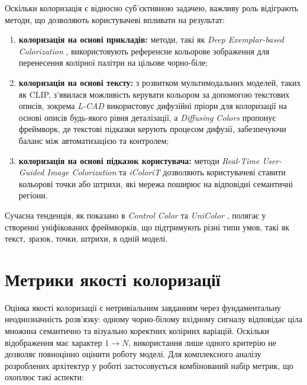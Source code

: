         Оскільки колоризація є відносно суб'єктивною задачею, важливу роль відіграють методи, що дозволяють користувачеві впливати на результат:
        \begin{enumerate}
            \item \textbf{колоризація на основі прикладів:}
                методи, такі як \textit{Deep Exemplar-based Colorization} \cite{2018-deep-exemplar-based-colorization}, використовують референсне кольорове зображення для перенесення колірної палітри на цільове чорно-біле;

            \item \textbf{колоризація на основі тексту:}
                з розвитком мультимодальних моделей, таких як CLIP, з'явилася можливість керувати кольором за допомогою текстових описів,
                зокрема \textit{L-CAD} \cite{2023-l-cad} використовує дифузійні пріори для колоризації на основі описів будь-якого рівня деталізації,
                а \textit{Diffusing Colors} \cite{2023-diffusing-colors} пропонує фреймворк, де текстові підказки керують процесом дифузії, забезпечуючи баланс між автоматизацією та контролем;

            \item \textbf{колоризація на основі підказок користувача:}
                методи \textit{Real-Time User-Guided Image Colorization} \cite{2017-real-time-user-guided-image-colorization} та \textit{iColoriT} \cite{2023-icolorit} дозволяють користувачеві ставити кольорові точки або штрихи, які мережа поширює на відповідні семантичні регіони.
        \end{enumerate}
        
        Сучасна тенденція, як показано в \textit{Control Color} \cite{2025-control-color} та \textit{UniColor} \cite{2022-unicolor}, полягає у створенні уніфікованих фреймворків, що підтримують різні типи умов, такі як текст, зразок, точки, штрихи, в одній моделі.

    \section{Метрики якості колоризації}

        Оцінка якості колоризації є нетривіальним завданням через фундаментальну неоднозначність розв'язку:
        одному чорно-білому вхідному сигналу відповідає ціла множина семантично та візуально коректних колірних варіацій.
        Оскільки відображення має характер $1 \to N$, використання лише одного критерію не дозволяє повноцінно оцінити роботу моделі.
        Для комплексного аналізу розроблених архітектур у роботі застосовується комбінований набір метрик, що охоплює такі аспекти:

